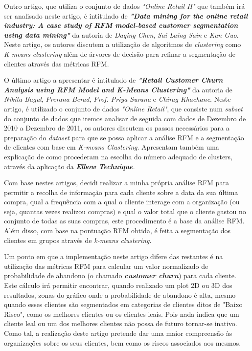 \documentclass{easychair}
\begin{document}
Outro artigo, que utiliza o conjunto de dados \textit{"Online Retail II"}\cite{dataset} que também irá ser analisado neste artigo, é intitulado de \textit{\textbf{"Data mining for the online retail industry: A case study of RFM model-based customer segmentation using data mining"}} da autoria de \textit{Daqing Chen}, \textit{Sai Laing Sain} e \textit{Kun Guo}. Neste artigo, os autores discutem a utilização de algoritmos de \textit{clustering} como \textit{K-means clustering} além de árvores de decisão para refinar a segmentação de clientes através das métricas RFM.

O último artigo a apresentar é intitulado de \textit{\textbf{"Retail Customer Churn Analysis using RFM Model and K-Means Clustering"}} da autoria de \textit{Nikita Bagul}, \textit{Prerana Berad}, \textit{Prof. Priya Surana} e \textit{Chirag Khachane}. Neste artigo, é utilizado o conjunto de dados \textit{"Online Retail"}\cite{dataset2}, que consiste num \textit{subset} do conjunto de dados que iremos analisar de seguida com dados de Dezembro de 2010 a Dezembro de 2011, os autores discutem os passos necessários para a preparação do \textit{dataset} para que se possa aplicar a análise RFM e a segmentação de clientes com base em \textit{K-means Clustering}. Apresentam também uma explicação de como procederam na escolha do número adequado de clusters, através da aplicação da \textit{\textbf{Elbow Technique}}.

Com base nestes artigos, decidi realizar a minha própria análise RFM para permitir a recolha de informação para cada cliente sobre a data da sua última compra, qual a frequência com a qual o cliente interage com a organização (ou seja, quantas vezes realizou compras) e qual o valor total que o cliente gastou no conjunto de todas as suas compras, este procedimento é a base da análise RFM. Além disso, com base na pontuação RFM obtida, é feita a segmentação dos clientes em grupos através de \textit{k-means clustering}.

Um ponto em que a implementação neste artigo difere das restantes é na utilização das métricas RFM para calcular um valor normalizado de probabilidade de abandono (o chamado \textbf{\textit{customer churn}}) para cada cliente. Este cálculo irá permitir encontrar, quando realizado um plot 2D ou 3D dos resultados, zonas do gráfico onde a probabilidade de abandono é alta, mesmo quando esses clientes são segmentados em categorias de clientes ditos de "Baixo Risco", como os melhores clientes ou os clientes leais. Pois nada indica que um cliente leal ou um dos melhores clientes não possa de futuro tornar-se inativo. Como tal, a realização deste artigo pretende dar uma maior compreensão às organizações sobre os seus clientes, bem como os riscos associados aos mesmos.
\end{document}

